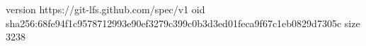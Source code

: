 version https://git-lfs.github.com/spec/v1
oid sha256:68fe94f1c9578712993e90ef3279c399c0b3d3ed01feca9f67c1eb0829d7305c
size 3238
